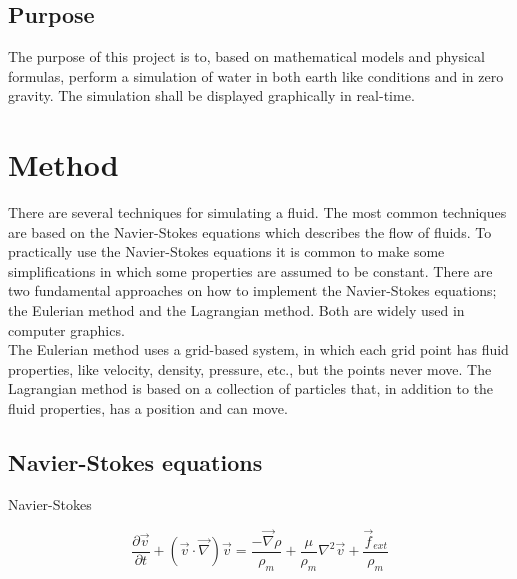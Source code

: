 \documentclass[a4paper,12pt,twoside]{report}
\begin{document}



\section{Purpose}

The purpose of this project is to, based on mathematical models and physical formulas, perform a simulation of water in both earth like conditions and in zero gravity. The simulation shall be displayed graphically in real-time.

\chapter{Method}

There are several techniques for simulating a fluid. The most common techniques are based on the Navier-Stokes equations which describes the flow of fluids. To practically use the Navier-Stokes equations it is common to make some simplifications in which some properties are assumed to be constant. There are two fundamental approaches on how to implement the Navier-Stokes equations; the Eulerian method and the Lagrangian method. Both are widely used in computer graphics. \\

\noindent The Eulerian method uses a grid-based system, in which each grid point has fluid properties, like velocity, density, pressure, etc., but the points never move.
The Lagrangian method is based on a collection of particles that, in addition to the fluid properties, has a position and can move.


\section{Navier-Stokes equations}

Navier-Stokes

\begin{equation}
\frac{\partial \overrightarrow v}{\partial t} + ({\overrightarrow v}\cdot{\overrightarrow \nabla}){\overrightarrow v} = \frac{-\overrightarrow \nabla \rho}{\rho_m} + \frac{\mu}{\rho_m}{ \nabla^2}{\overrightarrow v} + \frac{\overrightarrow f_{ext}}{\rho_m}
\end{equation} \\
\end{document}
